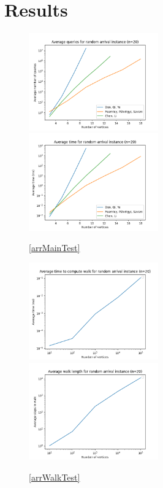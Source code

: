 \section{Results} \label{resultsSec}
  \begin{figure}[H]
      \centering
      \includegraphics[width=2.2in]{plots/arrival_queries.png}
      \centering
      \includegraphics[width=2.2in]{plots/arrival_time.png}
      \caption{\cref{arrMainTest}} \label{arrivalMainPlot}
  \end{figure}
  \begin{figure}[H]
      \centering
      \includegraphics[width=2.2in]{plots/arrival_steps.png}
      \centering
      \includegraphics[width=2.2in]{plots/arrival_wtime.png}
      \caption{\cref{arrWalkTest}} \label{arrivalWalkPlot}
  \end{figure}
